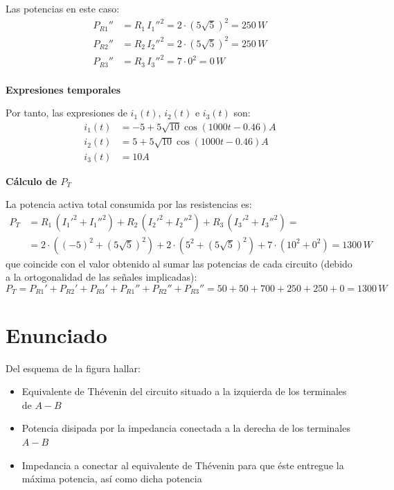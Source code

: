Las potencias en este caso:
\begin{align*}
  P_{R1}''&=R_1\,I_1''^2=2\cdot (5\sqrt{5})^2=250\,W\\
  P_{R2}''&=R_2\,I_2''^2=2\cdot (5\sqrt{5})^2=250\,W\\
  P_{R3}''&=R_3\,I_3''^2=7\cdot 0^2=0\,W\\
\end{align*}
    
\textbf{Expresiones temporales}
    
Por tanto, las expresiones de $i_1(t)$, $i_2(t)$ e $i_3(t)$ son:
\begin{align*}
  i_1(t)&= -5+5\sqrt{10}\cos(1000t-0.46) A \\
  i_2(t)&= 5+5\sqrt{10}\cos(1000t-0.46) A \\
  i_3(t)&= 10 A 
\end{align*}
    
\textbf{Cálculo de $P_T$}
    
La potencia activa total consumida por las resistencias es:
\begin{align*}
  P_T&=R_1\,(I_1'^2+I_1''^2)+R_2\,(I_2'^2+I_2''^2)+R_3\,(I_3'^2+I_3''^2)=\\
     &=2\cdot((-5)^2+(5\sqrt{5})^2)+2\cdot(5^2+(5\sqrt{5})^2)+7\cdot (10^2+0^2)={1300\,W}
\end{align*}
que coincide con el valor obtenido al sumar las potencias de cada
circuito (debido a la ortogonalidad de las señales implicadas):
\begin{equation*}
  P_T=P_{R1}'+P_{R2}'+P_{R3}'+P_{R1}''+P_{R2}''+P_{R3}''=50+50+700+250+250+0=1300\,W
\end{equation*}


\section{Enunciado}
Del esquema de la figura hallar:
\begin{itemize}
\item Equivalente de Thévenin del circuito situado a la izquierda de
  los terminales de $A-B$
\item Potencia disipada por la impedancia conectada a la derecha de
  los terminales $A-B$
\item Impedancia a conectar al equivalente de Thévenin para que éste
  entregue la máxima potencia, así como dicha potencia
\end{itemize}


